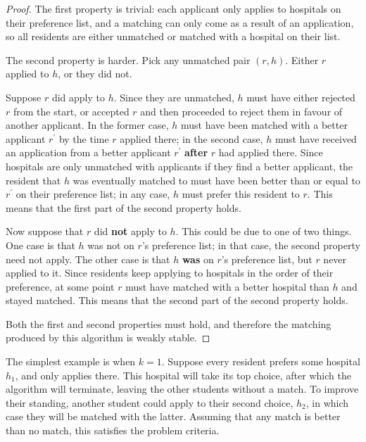 \begin{proof}
	The first property is trivial: each applicant only applies to hospitals on their preference list, and a matching can only come as a result of an application, so all residents are either unmatched or matched with a hospital on their list.

	The second property is harder. Pick any unmatched pair $(r, h)$. Either $r$ applied to $h$, or they did not.

	Suppose $r$ did apply to $h$. Since they are unmatched, $h$ must have either rejected $r$ from the start, or accepted $r$ and then proceeded to reject them in favour of another applicant. In the former case, $h$ must have been matched with a better applicant $r^\prime$ by the time $r$ applied there; in the second case, $h$ must have received an application from a better applicant $r^\prime$ \textbf{after} $r$ had applied there. Since hospitals are only unmatched with applicants if they find a better applicant, the resident that $h$ was eventually matched to must have been better than or equal to $r^\prime$ on their preference list; in any case, $h$ must prefer this resident to $r$. This means that the first part of the second property holds.

	Now suppose that $r$ did \textbf{not} apply to $h$. This could be due to one of two things. One case is that $h$ was not on $r$'s preference list; in that case, the second property need not apply. The other case is that $h$ \textbf{was} on $r$'s preference list, but $r$ never applied to it. Since residents keep applying to hospitals in the order of their preference, at some point $r$ must have matched with a better hospital than $h$ and stayed matched. This means that the second part of the second property holds.

	Both the first and second properties must hold, and therefore the matching produced by this algorithm is weakly stable.		
\end{proof}

 The simplest example is when $k = 1$. Suppose every resident prefers some hospital $h_1$, and only applies there. This hospital will take its top choice, after which the algorithm will terminate, leaving the other students without a match. To improve their standing, another student could apply to their second choice, $h_2$, in which case they will be matched with the latter. Assuming that any match is better than no match, this satisfies the problem criteria.


